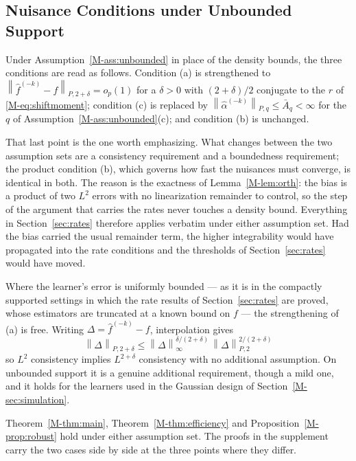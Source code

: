 \documentclass[12pt,a4paper]{article}
\numberwithin{equation}{section}
\theoremstyle{plain}
\theoremstyle{definition}
\newcommand{\norm}[1]{\left\| #1 \right\|}
\newcommand{\Ptwo}[1]{\norm{#1}_{P,2}}
\newcommand{\Pq}[2]{\norm{#1}_{P,#2}}
\begin{document}
	\subsection{Nuisance Conditions under Unbounded Support}

	Under Assumption~\ref{M-ass:unbounded} in place of the density bounds, the three
	conditions are read as follows. Condition (a) is strengthened to
	$\Pq{\hat{f}^{(-k)} - f}{2 + \delta} = o_p(1)$ for a $\delta > 0$ with
	$(2 + \delta)/2$ conjugate to the $r$ of \eqref{M-eq:shiftmoment}; condition (c) is
	replaced by $\Pq{\hat{\alpha}^{(-k)}}{q} \leq \bar{A}_q < \infty$ for the $q$ of
	Assumption~\ref{M-ass:unbounded}(c); and condition (b) is unchanged.

	That last point is the one worth emphasizing. What changes between the two
	assumption sets are a consistency requirement and a boundedness requirement; the
	product condition (b), which governs how fast the nuisances must converge, is
	identical in both. The reason is the exactness of Lemma~\ref{M-lem:orth}: the bias
	is a product of two $L^2$ errors with no linearization remainder to control, so
	the step of the argument that carries the rates never touches a density bound.
	Everything in Section~\ref{sec:rates} therefore applies verbatim under either
	assumption set. Had the bias carried the usual remainder term, the higher
	integrability would have propagated into the rate conditions and the thresholds
	of Section~\ref{sec:rates} would have moved.

	Where the learner's error is uniformly bounded --- as it is in the compactly
	supported settings in which the rate results of Section~\ref{sec:rates} are
	proved, whose estimators are truncated at a known bound on $f$ --- the
	strengthening of (a) is free. Writing $\Delta = \hat{f}^{(-k)} - f$,
	interpolation gives
	\begin{equation}
		\Pq{\Delta}{2 + \delta}
		\leq \norm{\Delta}_\infty^{\delta/(2 + \delta)}\,
		\Ptwo{\Delta}^{2/(2 + \delta)}
		\label{eq:interp}
	\end{equation}
	so $L^2$ consistency implies $L^{2+\delta}$ consistency with no additional
	assumption. On unbounded support it is a genuine additional requirement, though a
	mild one, and it holds for the learners used in the Gaussian design of
	Section~\ref{M-sec:simulation}.

	Theorem~\ref{M-thm:main}, Theorem~\ref{M-thm:efficiency} and
	Proposition~\ref{M-prop:robust} hold under either assumption set. The proofs in the
	supplement carry the two cases side by side at the three points where they differ.
\end{document}
